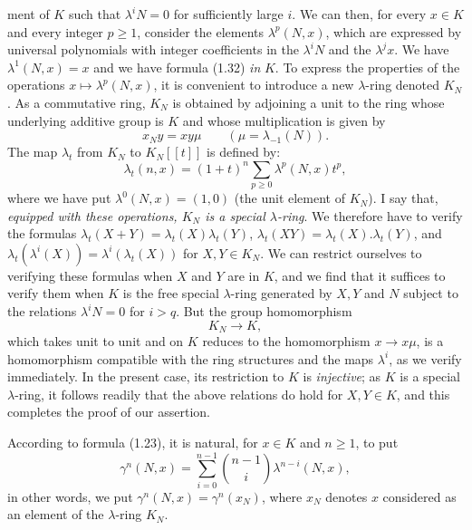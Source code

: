 %
ment of $K$ such that $\lambda^iN=0$ for sufficiently large $i$. We can then, for every $x\in K$ and every integer $p\geq1$, consider the elements $\lambda^p(N,x)$, which are expressed by universal polynomials with integer coefficients in the $\lambda^iN$ and the $\lambda^jx$. We have $\lambda^1(N,x)=x$ and we have formula (1.32) \emph{in} $K$. To express the properties of the operations $x\mapsto\lambda^p(N,x)$, it is convenient to introduce a new $\lambda$-ring denoted $K_N$. As a commutative ring, $K_N$ is obtained by adjoining a unit to the ring whose underlying additive group is $K$ and whose multiplication is given by
\begin{equation}\tag{1.34}
x_Ny=xy\mu\qquad (\mu=\lambda_{-1}(N)).
\end{equation}
The map $\lambda_t$ from $K_N$ to $K_N[[t]]$ is defined by:
\begin{equation}\tag{1.35}
\lambda_t(n,x)=(1+t)^n\sum_{p\geq0}\lambda^p(N,x)t^p,
\end{equation}
where we have put $\lambda^0(N,x)=(1,0)$ (the unit element of $K_N$). I say that, \emph{equipped with these operations, $K_N$ is a special $\lambda$-ring}. We therefore have to verify the formulas $\lambda_t(X+Y)=\lambda_t(X)\lambda_t(Y)$, $\lambda_t(XY)=\lambda_t(X).\lambda_t(Y)$, and $\lambda_t(\lambda^i(X))=\lambda^i(\lambda_t(X))$ for $X,Y\in K_N$. We can restrict ourselves to verifying these formulas when $X$ and $Y$ are in $K$, and we find that it suffices to verify them when $K$ is the free special $\lambda$-ring generated by $X,Y$ and $N$ subject to the relations $\lambda^iN=0$ for $i>q$. But the group homomorphism
\begin{equation}\tag{1.36}
K_N\longrightarrow K,
\end{equation}
which takes unit to unit and on $K$ reduces to the homomorphism $x\longrightarrow x\mu$, is a homomorphism compatible with the ring structures and the maps $\lambda^i$, as we verify immediately. In the present case,
%
its
restriction to $K$ is \emph{injective}; as $K$ is a special $\lambda$-ring, it follows readily that the above relations do hold for $X,Y\in K$, and this completes the proof of our assertion.

According to formula (1.23), it is natural, for $x\in K$ and $n\geq1$, to put
\begin{equation}\tag{1.37}
\gamma^n(N,x)=\sum_{i=0}^{n-1}\binom{n-1}{i}\lambda^{n-i}(N,x),
\end{equation}
in other words, we put $\gamma^n(N,x)=\gamma^n(x_N)$, where $x_N$ denotes $x$ considered as an element of the $\lambda$-ring $K_N$.

